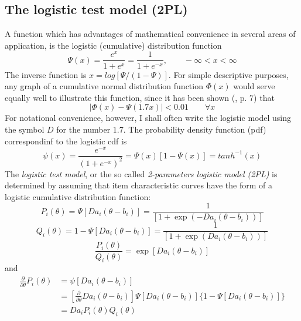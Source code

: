 \subsection{The logistic test model (2PL)}
A function which has advantages of mathematical convenience in several areas of application, is the logistic (cumulative) distribution function
\begin{equation}
\Psi(x)=\frac{e^x}{1+e^x}=\frac{1}{1+e^{-x}}, \qquad -\infty <x <\infty
\end{equation}
The inverse function is $x = log [\Psi/ (1 - \Psi)]$. For simple descriptive purposes, any graph of a cumulative normal distribution function $\Phi(x)$ would serve equally well to illustrate this function, since it has been shown (\cite{Haley1952}, p. 7) that
\begin{equation}
|\Phi(x)-\Psi(1.7x)| <0.01 \qquad \forall x
\end{equation}
For notational convenience, however, I shall often write the logistic model using the symbol $D$ for the number $1.7$.
The probability density function (pdf) correspondinf to the logistic cdf is
\begin{equation}
\psi(x)=\frac{e^{-x}}{(1+e^{-x})^2}=\Psi(x)[1-\Psi(x)]=tanh^{-1}(x)
\end{equation}
The \textit{logistic test model}, or the so called \textit{2-parameters logistic model (2PL)} is determined by assuming that item characteristic curves have the form of a logistic cumulative distribution function:
\begin{equation}
P_i(\theta)=\Psi[Da_i(\theta-b_i)]=\frac{1}{[1+\exp(-Da_i(\theta-b_i))]}
\end{equation}
\begin{equation}
Q_i(\theta)=1-\Psi[Da_i(\theta-b_i)]=\frac{1}{[1+\exp(Da_i(\theta-b_i))]}
\end{equation}
\begin{equation}
\frac{P_i(\theta)}{Q_i(\theta)}=\exp[Da_i(\theta-b_i)]
\end{equation}
and
\begin{equation}
\begin{split}
\frac{\partial}{\partial\theta}P_i(\theta)&=\psi[Da_i(\theta-b_i)]\\
	               &=\left[ \frac{\partial}{\partial\theta}Da_i(\theta-b_i) \right]\Psi[Da_i(\theta-b_i)]\{1-\Psi[Da_i(\theta-b_i)]\}\\
	               &=Da_iP_i(\theta)Q_i(\theta)\\
\end{split}
\end{equation}
